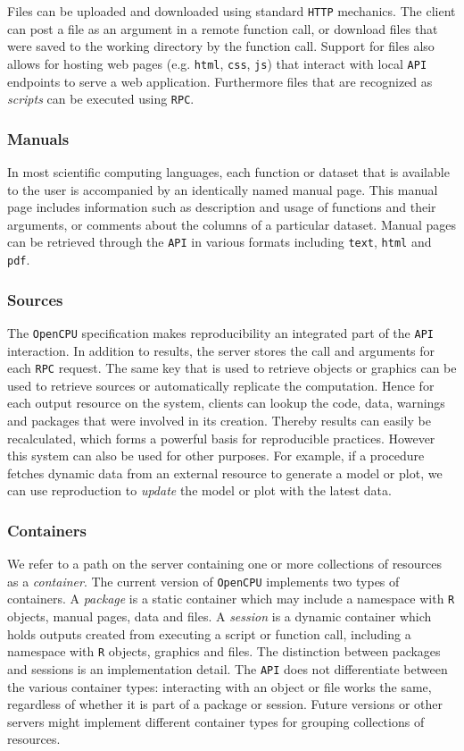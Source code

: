 \documentclass{article}
\newcommand{\R}{\texttt{R}\xspace}
\newcommand{\HTTP}{\texttt{HTTP}\xspace}
\newcommand{\API}{\texttt{API}\xspace}
\newcommand{\RPC}{\texttt{RPC}\xspace}
\newcommand{\OpenCPU}{\texttt{OpenCPU}\xspace}
\begin{document}
Files can be uploaded and downloaded using standard \HTTP mechanics. The client can post a file as an argument in a remote function call, or download files that were saved to the working directory by the function call. Support for files also allows for hosting web pages (e.g. \texttt{html}, \texttt{css}, \texttt{js}) that interact with local \API endpoints to serve a web application. Furthermore files that are recognized as \emph{scripts} can be executed using \RPC.

\subsubsection{Manuals}

In most scientific computing languages, each function or dataset that is available to the user is accompanied by an identically named manual page. This manual page includes information such as description and usage of functions and their arguments, or comments about the columns of a particular dataset. Manual pages can be retrieved through the \API in various formats including \texttt{text}, \texttt{html} and \texttt{pdf}.

\subsubsection{Sources}

The \OpenCPU specification makes reproducibility an integrated part of the \API interaction. In addition to results, the server stores the call and arguments for each \RPC request. The same key that is used to retrieve objects or graphics can be used to retrieve sources or automatically replicate the computation. Hence for each output resource on the system, clients can lookup the code, data, warnings and packages that were involved in its creation. Thereby results can easily be recalculated, which forms a powerful basis for reproducible practices. However this system can also be used for other purposes. For example, if a procedure fetches dynamic data from an external resource to generate a model or plot, we can use reproduction to \emph{update} the model or plot with the latest data.

\subsubsection{Containers}

We refer to a path on the server containing one or more collections of resources as a \emph{container}. The current version of \OpenCPU implements two types of containers. A \emph{package} is a static container which may include a namespace with \R objects, manual pages, data and files.  A \emph{session} is a dynamic container which holds outputs created from executing a script or function call, including a namespace with \R objects, graphics and files. The distinction between packages and sessions is an implementation detail. The \API does not differentiate between the various container types: interacting with an object or file works the same, regardless of whether it is part of a package or session. Future versions or other servers might implement different container types for grouping collections of resources.
\end{document}
